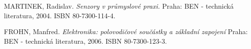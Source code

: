 \begin{literatura}{99}

    MARTINEK, Radislav.
    \emph{Senzory v průmyslové praxi.}
    Praha: BEN - technická literatura, 2004. ISBN 80-7300-114-4.

    FROHN, Manfred.
    \emph{Elektronika: polovodičové součástky a základní zapojení}
    Praha: BEN - technická literatura, 2006. ISBN 80-7300-123-3.

\end{literatura}

